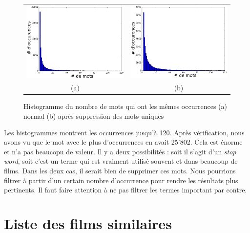 \begin{figure}[h!]
    \centering
    \begin{tabular}{cc}
      \includegraphics[width=.5\linewidth]{img/data3-3393-120.png} &
      \includegraphics[width=.5\linewidth]{img/data4-3393-120.png} \\
      (a) & (b)\\
    \end{tabular}
    \caption{Histogramme du nombre de mots qui ont les mêmes occurrences (a) normal (b) après suppression des mots uniques
    \label{histooccurrence}}
\end{figure}

Les histogrammes montrent les occurrences jusqu'à 120. Après vérification, nous avons vu que le mot avec le plus d'occurrences en avait 25'802. Cela est énorme et n'a pas beaucopu de valeur. Il y a deux possibilités : soit il s'agit d'un \textit{stop word}, soit c'est un terme qui est vraiment utilisé souvent et dans beaucoup de films. Dans les deux cas, il serait bien de supprimer ces mots. Nous pourrions filtrer à partir d'un certain nombre d'occurrence pour rendre les résultats plus pertinents. Il faut faire attention à ne pas filtrer les termes important par contre.


\section{Liste des films similaires}

